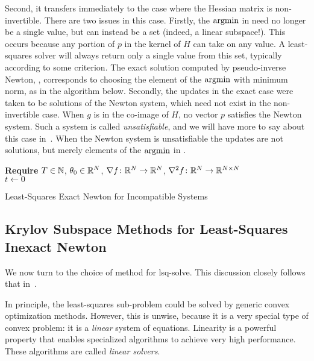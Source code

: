 \documentclass[../../thesis.tex]{subfiles}
\begin{document}
Second, it transfers immediately to the case
where the Hessian matrix is non-invertible.
There are two issues in this case.
Firstly,
the $\mathop{\mathrm{argmin}}$ in 
need no longer be a single value,
but can instead be a set
(indeed, a linear subspace!).
This occurs because
any portion of $p$
in the kernel of $H$ can take on any value.
A least-squares solver
will always return only
a single value from this set,
typically according to some criterion.
The exact solution computed by
pseudo-inverse Newton,
,
corresponds to choosing the element of the $\mathop{\mathrm{argmin}}$
with minimum norm,
as in the algorithm below.
Secondly,
the updates in the exact case were taken to be solutions
of the Newton system,
which need not exist in the non-invertible case.
When $g$ is in the co-image of $H$,
no vector $p$ satisfies the Newton system.
Such a system is called \emph{unsatisfiable},
and we will have more to say about this case in~.
When the Newton system is unsatisfiable
the updates are not solutions,
but merely elements of the $\mathop{\mathrm{argmin}}$ in .
\\
\begin{algorithm}[H]
    \SetAlgoLined{}
    \textbf{Require}
    $T\in \mathbb{N}$, $\theta_0 \in \mathbb{R}^N$,
    $\nabla{f}\colon\mathbb{R}^N\to\mathbb{R}^N$,
    $\nabla^2{f}\colon\mathbb{R}^N\to\mathbb{R}^{N\times N}$\\
    $t \leftarrow 0$\\
    \caption{Least-Squares Exact Newton for Incompatible Systems}
\end{algorithm}

\subsection{Krylov Subspace Methods for Least-Squares Inexact Newton}

We now turn to the choice of method for lsq-solve.
This discussion closely follows that in~\cite{roosta2018}.

In principle, the least-squares sub-problem
could be solved by generic convex optimization methods.
However, this is unwise, because it is a very special type
of convex problem:
it is a \emph{linear} system of equations.
Linearity is a powerful property that enables
specialized algorithms to achieve very high performance.
These algorithms are called \emph{linear solvers}.
\end{document}
